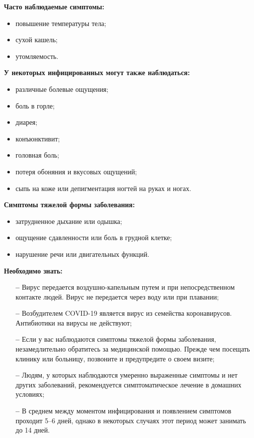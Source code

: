\documentclass[a4paper, 12pt]{extarticle}
\begin{document}
\textbf{Часто наблюдаемые симптомы:}
\begin{itemize}
    \item повышение температуры тела;
    \item сухой кашель;
    \item утомляемость.
\end{itemize}

\vspace{5mm}

\textbf{У некоторых инфицированных могут также наблюдаться:}
\begin{itemize}
    \item различные болевые ощущения;
    \item боль в горле;
    \item диарея;
    \item конъюнктивит;
    \item головная боль;
    \item потеря обоняния и вкусовых ощущений;
    \item сыпь на коже или депигментация ногтей на руках и ногах.
\end{itemize}

\vspace{5mm}

\textbf{Симптомы тяжелой формы заболевания:}
\begin{itemize}
    \item затрудненное дыхание или одышка;
    \item ощущение сдавленности или боль в грудной клетке;
    \item нарушение речи или двигательных функций.
\end{itemize}

\vspace{5mm}

\textbf{Необходимо знать:}
\begin{itemize}
    \item[\bfseries--] Вирус передается воздушно-капельным путем и при непосредственном контакте людей. Вирус не передается через воду или при плавании;

    \item[\bfseries--] Возбудителем COVID-19 является вирус из семейства коронавирусов.  Антибиотики на вирусы не действуют;

    \item[\bfseries--] Если у вас наблюдаются симптомы тяжелой формы заболевания, незамедлительно обратитесь за медицинской помощью. Прежде чем посещать клинику или больницу, позвоните и предупредите о своем визите;

    \item[\bfseries--] Людям, у которых наблюдаются умеренно выраженные симптомы и нет других заболеваний, рекомендуется симптоматическое лечение в домашних условиях;

    \item[\bfseries--] В среднем между моментом инфицирования и появлением симптомов проходит 5–6 дней, однако в некоторых случаях этот период может занимать до 14 дней.

\end{itemize}
\newpage
\end{document}

